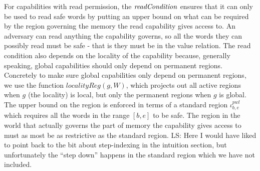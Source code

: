 \documentclass[acmsmall,review]{acmart}\settopmatter{printfolios=true}
\newcommand\lau[1]{{\color{purple} \sf \footnotesize {LS: #1}}\\}
\newcommand{\var}[1]{\mathit{#1}}
\newcommand{\gl}{\var{g}}
\newcommand{\start}{\var{b}}
\newcommand{\addrend}{\var{e}}
\newcommand{\pwl}{\var{pwl}}
\newcommand{\plainfun}[2]{
  \ifthenelse{\equal{#2}{}}
  {\mathit{#1}}
  {\mathit{#1}(#2)}
}
\newcommand{\readCond}[1]{\plainfun{readCondition}{#1}}
\begin{document}
For capabilities with read permission, the $\readCond{}$ ensures that it can
only be used to read safe words by putting an upper bound on what can be
required by the region governing the memory the read capability gives access
to. An adversary can read anything the capability governs, so all the words they
can possibly read must be safe - that is they must be in the value relation. The
read condition also depends on the locality of the capability because, generally
speaking, global capabilities should only depend on permanent
regions. Concretely to make sure global capabilities only depend on permanent
regions, we use the function $\var{localityReg}(\gl,W)$, which projects out all
active regions when $\gl$ (the locality) is local, but only the permanent
regions when $\gl$ is global. The upper bound on the region is enforced in terms
of a standard region $\iota^\pwl_{\start,\addrend}$ which requires all the words
in the range $[\start,\addrend]$ to be safe.  The region in the world that
actually governs the part of memory the capability gives access to must as most
be as restrictive as the standard region.  \lau{Here I would have liked to point
  back to the bit about step-indexing in the intuition section, but
  unfortunately the ``step down'' happens in the standard region which we have
  not included.}
\end{document}
